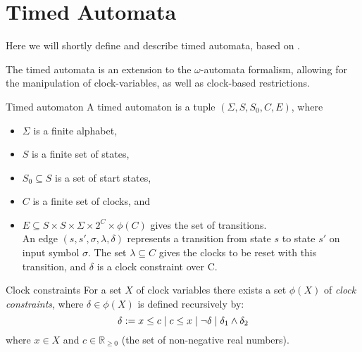 
\section{Timed Automata}
Here we will shortly define and describe timed automata, based on \cite{timed_automata}.

The timed automata is an extension to the $\omega$-automata formalism, allowing for the manipulation of clock-variables, as well as clock-based restrictions.

\begin{definition}{Timed automaton}
A timed automaton is a tuple $(\Sigma, S, S_0, C, E)$, where
\begin{itemize}
  \item $\Sigma$ is a finite alphabet,
  \item $S$ is a finite set of states,
  \item $S_0 \subseteq S$ is a set of start states,
  \item $C$ is a finite set of clocks, and
  \item $E \subseteq S \times S \times \Sigma \times 2^C \times \phi(C)$ gives the set of transitions. \\
    An edge $(s, s', \sigma, \lambda, \delta)$ represents a transition from state $s$ to state $s'$ on input symbol $\sigma$.
    The set $\lambda \subseteq C$ gives the clocks to be reset with this transition, and $\delta$ is a clock constraint over C.
\end{itemize}
\end{definition}

\begin{definition}{Clock constraints}
For a set $X$ of clock variables there exists a set $\phi(X)$ of \emph{clock constraints}, where $\delta \in \phi(X)$ is defined recursively by:
\[ \delta := x \leq c \; | \; c \leq x \; | \; \lnot \delta \; | \; \delta_1 \land \delta_2 \]
where $x \in X$ and $c \in \mathbb{R}_{\geq 0}$ (the set of non-negative real numbers).
\end{definition}
